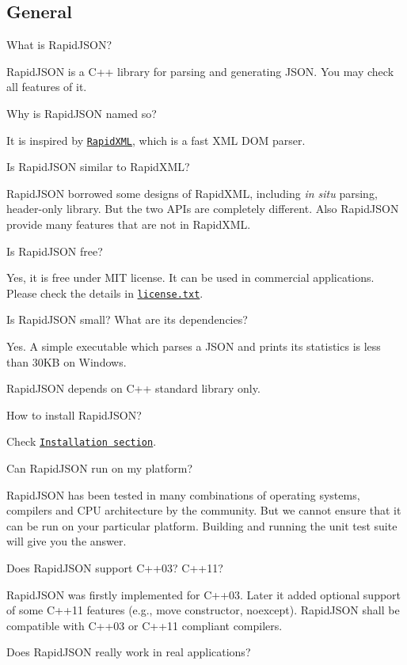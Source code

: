 \subsection*{General}


\begin{DoxyEnumerate}
\item What is Rapid\+J\+S\+ON?

Rapid\+J\+S\+ON is a C++ library for parsing and generating J\+S\+ON. You may check all features of it.
\item Why is Rapid\+J\+S\+ON named so?

It is inspired by \href{http://rapidxml.sourceforge.net/}{\tt Rapid\+X\+ML}, which is a fast X\+ML D\+OM parser.
\item Is Rapid\+J\+S\+ON similar to Rapid\+X\+ML?

Rapid\+J\+S\+ON borrowed some designs of Rapid\+X\+ML, including {\itshape in situ} parsing, header-\/only library. But the two A\+P\+Is are completely different. Also Rapid\+J\+S\+ON provide many features that are not in Rapid\+X\+ML.
\item Is Rapid\+J\+S\+ON free?

Yes, it is free under M\+IT license. It can be used in commercial applications. Please check the details in \href{https://github.com/miloyip/rapidjson/blob/master/license.txt}{\tt license.\+txt}.
\item Is Rapid\+J\+S\+ON small? What are its dependencies?

Yes. A simple executable which parses a J\+S\+ON and prints its statistics is less than 30\+KB on Windows.

Rapid\+J\+S\+ON depends on C++ standard library only.
\item How to install Rapid\+J\+S\+ON?

Check \href{https://miloyip.github.io/rapidjson/}{\tt Installation section}.
\item Can Rapid\+J\+S\+ON run on my platform?

Rapid\+J\+S\+ON has been tested in many combinations of operating systems, compilers and C\+PU architecture by the community. But we cannot ensure that it can be run on your particular platform. Building and running the unit test suite will give you the answer.
\item Does Rapid\+J\+S\+ON support C++03? C++11?

Rapid\+J\+S\+ON was firstly implemented for C++03. Later it added optional support of some C++11 features (e.\+g., move constructor, {\ttfamily noexcept}). Rapid\+J\+S\+ON shall be compatible with C++03 or C++11 compliant compilers.
\item Does Rapid\+J\+S\+ON really work in real applications?


\end{DoxyEnumerate}
